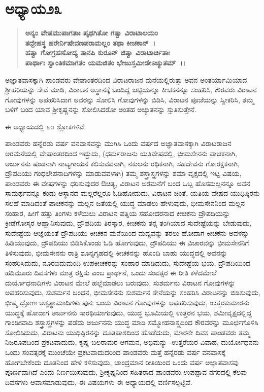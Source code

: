 \section*{ಅಧ್ಯಾಯ\enginline{-}೨೩}

\begin{verse}
\textbf{ಅನ್ಯಂ ವೇಷಮುಪಾಗತಾಃ ಪೃಥಗಿತೋ ಗತ್ವಾ ವಿರಾಟಾಲಯಂ}\\\textbf{ ತದ್ದೇಹಸ್ಥ ಹರೇರ್ನಿಷೇವಣಪರಾಮಲ್ಲಂ ತಥಾ ಕೀಚಕಾನ್~।}\\\textbf{ಹತ್ವಾ ಗೋಗ್ರಹಣೋದ್ಯ ತಾನಪಿ ಕುರೂನ್ ಜಿತ್ವಾ ವಿರಾಟಾರ್ಚಿತಾಃ }\\\textbf{ಪಾರ್ಥಾಃ ಸ್ವಾಂತಿಕಮಾಗತಂ ಯಮಜಿತಂ ಭೇಜುಸ್ತಮೀಡೇಽಚ್ಯುತಮ್~।।}
\end{verse}

ಅಜ್ಞಾತವಾಸಕ್ಕಾಗಿ ಪಾಂಡವರು ವೇಷಾಂತರದಿಂದ ವಿರಾಟರಾಜನ ಮನೆಯಲ್ಲಿರುತ್ತಾ ಅವನ ಅಂತರ್ಯಾಮಿಯಾದ ಶ‍್ರೀಹರಿಯನ್ನು ಸೇವೆ ಮಾಡಿ, ವಿರಾಟನ ಅಸ್ಥಾನಕ್ಕೆ ಬಂದಿದ್ದ ಜಟ್ಟಿಯನ್ನೂ ಕೀಚಕನನ್ನೂ ಸಂಹರಿಸಿ, ಕೌರವರು ವಿರಾಟನ ಗೋವುಗಳನ್ನು ಅಪಹರಿಸಿದಾಗ ಅವರನ್ನು ಸೋಲಿಸಿ ಗೋವುಗಳನ್ನು ಬಿಡಿಸಿ, ವಿರಾಟನ ಪೂಜೆಯನ್ನು ಸ್ವೀಕರಿಸಿ, ತಮ್ಮ ಬಳಿಗೆ ಬಂದ ಯಾವ ಶ‍್ರೀಕೃಷ್ಣನನ್ನು ಸೋಲಿಸಿದರೋ ಅಂತಹ ಅಚ್ಯುತನನ್ನು ಸ್ತುತಿಸುತ್ತೇನೆ.

ಈ ಅಧ್ಯಾಯದಲ್ಲಿ ೬೦ ಶ್ಲೋಕಗಳಿವೆ.

ಪಾಂಡವರು ಹನ್ನೆರಡು ವರ್ಷ ವನವಾಸವನ್ನು ಮುಗಿಸಿ ಒಂದು ವರ್ಷದ ಅಜ್ಞಾತವಾಸಕ್ಕಾಗಿ ವಿರಾಟರಾಜನ ಅರಮನೆಯಲ್ಲಿ ವೇಷಾಂತರದಿಂದ ಇದ್ದುದು, (ಧರ್ಮರಾಜನು ಯತಿವೇಷದಲ್ಲಿ, ಭೀಮಸೇನನು ಪಾಚಕನಾಗಿ, ಅರ್ಜುನನು ಷಂಡನಾಗಿ ನಾಟ್ಯಗಾಯನ ಕಲಿಸುವವನಾಗಿ, ನಕುಲನು ರಥಿಕನಾಗಿ, ಸಹದೇವನು ಗೋರಕ್ಷಕನಾಗಿ, ದ್ರೌಪದಿಯು ಗಂಧಲೇಪನಾದಿಗಳನ್ನು ಮಾಡುವವಳಾಗಿ) ತಮ್ಮ ಶಸ್ತ್ರಾಸ್ತ್ರಗಳನ್ನು ಶಮಾ ವೃಕ್ಷದಲ್ಲಿ ಇಟ್ಟ ವಿಷಯ, ಪಾಂಡವರು ಈ ವೇಷಗಳನ್ನು ಧರಿಸುವುದರ ಔಚಿತ್ಯ, ವಿರಾಟನ ಅರಮನೆಗೆ ಬಂದ ಒಬ್ಬ ಹೊಸಮಲ್ಲನನ್ನೂ ಅವನ ಸಾಮರ್ಥವನ್ನೂ ಕಂಡು ಆಸ್ಥಾನದ ಮಲ್ಲರೆಲ್ಲರೂ ಓಡಿಹೋದುದು, ವಿರಾಟನ ಚಿಂತೆ, ಯತಿಯ ವೇಷದ ಯುಧಿಷ್ಠಿರನು ಸಲಹೆ ಮಾಡಿದಂತೆ ಪಾಚಕನನ್ನು ಮಲ್ಲನ ಜತೆಯಲ್ಲಿ ಯುದ್ಧ ಮಾಡಲು ಹೇಳುವುದು, ಭೀಮಸೇನನಿಂದ ಮಲ್ಲನ ಸಂಹಾರ, ಹೀಗೆ ಹತ್ತು ತಿಂಗಳು ಕಳೆಯಲು ವಿರಾಟನ ಪತ್ನಿಯ ಸಹೋದರನಾದ ಕೀಚಕನು ದ್ರೌಪದಿಯನ್ನು ಕ್ರೀಡೆಗೋಸ್ಕರ ಆಹ್ವಾನಿಸುವುದು, ದ್ರೌಪದಿಯ ತಿರಸ್ಕಾರ, ಕೀಚಕನು ತನ್ನ ತಂಗಿಯಾದ ಸುದೇಷ್ಟೆಯನ್ನು ಬೇಡುವುದು, ಸುದೇಷ್ಟೆಯ ಆಜ್ಞೆಯಂತೆ ದ್ರೌಪದಿಯು ಕೀಚಕನ ಮನೆಯಿಂದ ಮದ್ಯವನ್ನು ತರಲು ಹೋದಾಗ ಕೀಚಕನು ಅವಳನ್ನು ಹಿಡಿಯುವುದು, ದ್ರೌಪದಿಯು ಬಿಡಿಸಿಕೊಂಡು ಓಡಿ ಹೋಗುವುದು, ದ್ರೌಪದಿಯು ಈ ವಿಚಾರವನ್ನು ಭೀಮಸೇನನಿಗೆ ತಿಳಿಸುವುದು, ಭೀಮಸೇನನು ರಾತ್ರಿ ಶೂನ್ಯಗೃಹದಲ್ಲಿ ಕೀಚಕನನ್ನು ಹೊಂದಿ ಬಾಹು ಯುದ್ಧದಲ್ಲಿ ಅವನನ್ನು ಸಂಹರಿಸಿದುದು, ನೂರಐದುಮಂದಿ ಉಪಕೀಚಕರನ್ನು ಸಂಹಾರ ಮಾಡಿದುದು, ಸುದೇಷ್ಟೆಯ ಭಯ, ದ್ರೌಪದಿಯಿಂದ ಹದಿಮೂರು ದಿವಸಗಳು ಮಾತ್ರ ರಕ್ಷಿಸು ಎಂಬ ಪ್ರಾರ್ಥನೆ, ಒಂದು ಸಂವತ್ಸರ ಈ ರೀತಿ ಕಳೆದಮೇಲೆ ದುರ್ಯೊಧನಾದಿಗಳು ವಿರಾಟನ ಮೇಲೆ ಹಲ್ಲೆಮಾಡಲು ಬರುವುದು, ಸುಶರ್ಮನು ವಿರಾಟನ ಗೋವುಗಳನ್ನು ಅಪಹರಿಸುವುದು, ಸುಶರ್ಮನ ಬಂಧನ, ಭೀಮಸೇನನು ಸುಶರ್ಮನ ಸೇನೆಯನ್ನು ಸಂಹರಿಸಿ ವಿರಾಟನನ್ನು ಬಿಡಿಸುವುದು, ಭೀಷ್ಮ ದ್ರೋಣ ಅಶ್ವತ್ಥಾಮಾದಿಗಳು ಪುನಃ ಬಂದು ವಿರಾಟನ ಗೋವುಗಳನ್ನು ಅಪಹರಿಸುವುದು, ಉತ್ತರಕುಮಾರನು ಯುದ್ಧಕ್ಕೆ ಹೋದಾಗ ಅರ್ಜುನನು ಸಾರಥಿಯಾಗುವುದು, ಯುದ್ಧ ಭೂಮಿಯಲ್ಲಿ ಉತ್ತರನ ಭಯ, ಶಮೀವೃಕ್ಷದಲ್ಲಿದ್ದ ಗಾಂಡೀವಾದಿ ಶಸ್ತ್ರಾಸ್ತ್ರಗಳನ್ನು ಪಡೆದು ಅರ್ಜುನನು ಯುದ್ಧ ಮಾಡಿ ಸಮ್ಮೋಹನಾಸ್ತ್ರದಿಂದ ಕೌರವರನ್ನು ಮೂರ್ಛಗೊಳಿಸಿ ಸೋಲಿಸಿದುದು, ವಿರಾಟನು ಯುಧಿಷ್ಠಿರನನ್ನು ದೂತಪಾಶದಿಂದ ಹೊಡೆದುದು, ಮಾರನೇ ದಿವಸ ಪಾಂಡವರು ತಮ್ಮ ನಿಜರೂಪದಿಂದ ಪ್ರಕಟವಾದುದು, ಕೃಷ್ಣ ಬಲರಾಮರ ಆಗಮನ, ಅಭಿಮನ್ಯು -ಉತ್ತರೆಯರ ವಿವಾಹ, ದುರ್ಯೋಧನನು ಒಂದು ಸಂವತ್ಸರಕ್ಕೆ ಮುಂಚೆಯೇ ಪ್ರಕಟವಾದುದರಿಂದ ಪಾಂಡವರು ಮತ್ತೆ ಹನ್ನೆರಡು ವರ್ಷ ವನವಾಸಕ್ಕೆ ಹೋಗಬೇಕೆಂದು ದೂತನಿಂದ ಹೇಳಿ ಕಳಿಸುವುದು, ಚಾಂದ್ರಮಾನ ರೀತಿಯಿಂದ ಒಂದು ವರ್ಷ ಅಜ್ಞಾತವಾಸವು ಪೂರ್ಣವಾಗಿದೆ ಎಂದು ನಿರ್ಣಯಿಸುವುದು, ಶ‍್ರೀಕೃಷ್ಣನಿಂದ ಸಹಿತರಾದ ಪಾಂಡವರು ಉಪಪ್ಪಾವ ನಗರದಲ್ಲಿ ಕೆಲವು ದಿವಸಗಳು ಆವಾಸಮಾಡುವುದು, ಈ ವಿಷಯಗಳು ಈ ಅಧ್ಯಾಯದಲ್ಲಿ ವರ್ಣಿಸಲ್ಪಟ್ಟಿವೆ.



